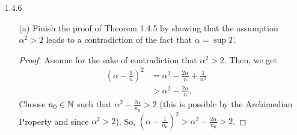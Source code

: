 \documentclass[12pt,letterpaper]{article}
\begin{document}
\begin{itemize}[leftmargin=!,labelindent=5pt]
\begin{itemize}
\begin{proof}
                        Assume for the sake of contradiction that for $at \in \mathbb{Q}$.
                        Then, $t = (\frac{1}{a}) * (at)$.
                        Since $\mathbb{Q}$ is closed under multiplication, this means that $t \in \mathbb{Q}$.
                        However, this contradicts the initial claim $t \in \mathbb{I}$.
                        Thus, $at\in \mathbb{I}$.
                    \end{proof}
                \item [(c)] Part (a) can be summarized by saying that $\mathbb{Q}$ is closed under addition and multiplication. Is $\mathbb{I}$ closed under addition and multiplication? Given two irrational numbers $s$ and $t$, what can we say about $s + t$ and $st$?
                
                    $\mathbb{I}$ is not closed under addition nor is it closed under multiplication. 
                    Given $s,t \in \mathbb{I}$, $s+t$ and $st$ can be in $\mathbb{I}$ or not in $\mathbb{I}$ depending on the specific values of $s$ and $t$.
                    For example, let $s=\sqrt{2}$ and $t = -\sqrt{2}$.
                    Then, $s+t = 0 \notin \mathbb{I}$ and $st = -2 \notin \mathbb{I}$.
                    But now let $s = \sqrt{2}$ and $t = \sqrt{3}$.
                    Then, $s + t = (\sqrt{2} + \sqrt{3}) \in \mathbb{I}$ and $st = \sqrt{6} \in \mathbb{I}$.
            \end{itemize}
        \item[1.4.6]
            \begin{itemize}
                \item [(a)] Finish the proof of Theorem 1.4.5 by showing that the assumption $\alpha ^2 > 2$ leads to a contradiction of the fact that $\alpha = \sup T$.
                    \begin{proof}
                        Assume for the sake of contradiction that $\alpha ^2 > 2$. Then, we get
                        \begin{align*}
                            (\alpha - \frac{1}{n})^2 &= \alpha^2 - \frac{2\alpha}{n} + \frac{1}{n^2} \\
                            &> \alpha^2 - \frac{2\alpha}{n}.
                        \end{align*}
                        Choose $n_0 \in \mathbb{N}$ such that $\alpha^2 - \frac{2\alpha}{n_0} > 2$ (this is possible by the Archimedian Property and since $\alpha^2 > 2$).
                        So, $(\alpha - \frac{1}{n_0})^2 > \alpha^2 - \frac{2\alpha}{n_0} > 2$. 

\end{proof}
\end{itemize}
\end{itemize}
\end{document}
